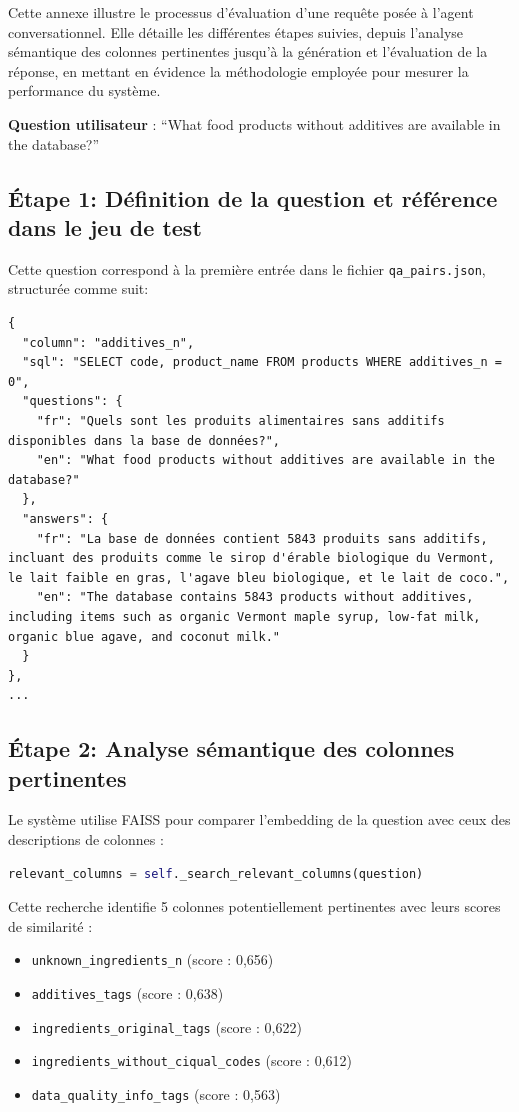\documentclass[a4paper,11pt]{article}
\begin{document}
Cette annexe illustre le processus d’évaluation d’une requête posée à l’agent conversationnel. Elle détaille les différentes étapes suivies, depuis l’analyse sémantique des colonnes pertinentes jusqu’à la génération et l’évaluation de la réponse, en mettant en évidence la méthodologie employée pour mesurer la performance du système.

\textbf{Question utilisateur} : 
\enquote{What food products without additives are available in the database?}


\subsection*{Étape 1: Définition de la question et référence dans le jeu de test}

Cette question correspond à la première entrée dans le fichier \texttt{qa\_pairs.json}, structurée comme suit:


\begin{lstlisting}
{
  "column": "additives_n",
  "sql": "SELECT code, product_name FROM products WHERE additives_n = 0",
  "questions": {
    "fr": "Quels sont les produits alimentaires sans additifs disponibles dans la base de données?",
    "en": "What food products without additives are available in the database?"
  },
  "answers": {
    "fr": "La base de données contient 5843 produits sans additifs, incluant des produits comme le sirop d'érable biologique du Vermont, le lait faible en gras, l'agave bleu biologique, et le lait de coco.",
    "en": "The database contains 5843 products without additives, including items such as organic Vermont maple syrup, low-fat milk, organic blue agave, and coconut milk."
  }
},
...
\end{lstlisting}

\subsection*{Étape 2: Analyse sémantique des colonnes pertinentes}

Le système utilise FAISS pour comparer l'embedding de la question avec ceux des descriptions de colonnes :

\begin{lstlisting}[language=Python, caption=Recherche sémantique des colonnes pertinentes]
relevant_columns = self._search_relevant_columns(question)
\end{lstlisting}

Cette recherche identifie 5 colonnes potentiellement pertinentes avec leurs scores de similarité :
\begin{itemize}
  \item \texttt{unknown\_ingredients\_n} (score : 0,656)
  \item \texttt{additives\_tags} (score : 0,638)
  \item \texttt{ingredients\_original\_tags} (score : 0,622)
  \item \texttt{ingredients\_without\_ciqual\_codes} (score : 0,612)
  \item \texttt{data\_quality\_info\_tags} (score : 0,563)
\end{itemize}
\end{document}
